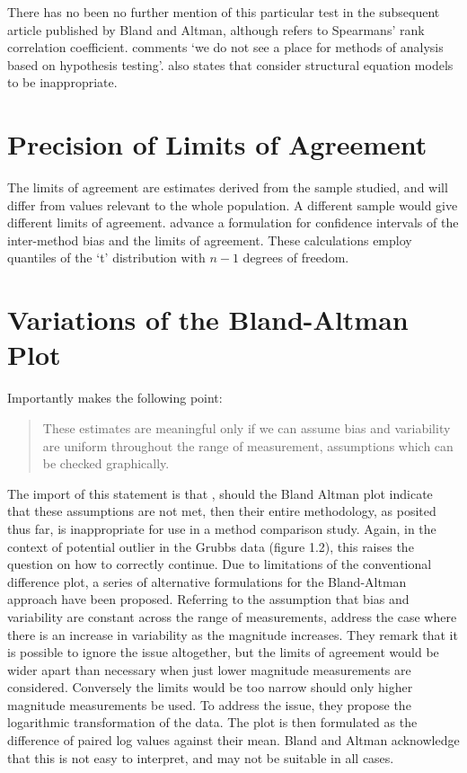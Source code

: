 \documentclass[12pt, a4paper]{report}
\theoremstyle{plain}
\theoremstyle{definition}
\theoremstyle{remark}
\begin{document}
There has no been no further mention of this particular test in
the subsequent article published by Bland and Altman, although
\citet{BA99} refers to Spearmans' rank correlation coefficient.
\citet{BA99} comments `we do not see a
place for methods of analysis based on hypothesis testing'.
\citet{BA99} also states that consider structural equation models
to be inappropriate.
\section{Precision of Limits of Agreement}
The limits of agreement are estimates derived from the sample
studied, and will differ from values relevant to the whole
population. A different sample would give different limits of
agreement. \citet*{BA86} advance a formulation for confidence
intervals of the inter-method bias and the limits of agreement.
These calculations employ quantiles of the `t' distribution with
$n -1$ degrees of freedom.

\section{Variations of the Bland-Altman Plot} 
Importantly \citet{BA99} makes the following point:
\begin{quote}These estimates are meaningful only if we can assume
	bias and variability are uniform throughout the range of
	measurement, assumptions which can be checked graphically.
\end{quote}

The import of this statement is that , should the Bland Altman
plot indicate that these assumptions are not met, then their
entire methodology, as posited thus far, is inappropriate for use
in a method comparison study. Again, in the context of potential
outlier in the Grubbs data (figure 1.2), this raises the question
on how to correctly continue. Due to limitations of the conventional difference plot, a series of alternative formulations for the Bland-Altman approach have been proposed.
Referring to the assumption that bias and variability are constant across the range
of measurements, \citet{BA99} address the case where there is an increase in variability as the magnitude increases. They remark 	that it is possible to ignore the issue altogether, but the limits of agreement would be wider apart than necessary when just lower magnitude measurements are considered. Conversely the limits would be too narrow should only higher magnitude measurements be used.	To address the issue, they propose the logarithmic transformation of the data. The plot is then formulated as the difference of paired log values against their mean. Bland and Altman acknowledge that this is not easy to interpret, and may not be suitable in all cases.
\end{document}
